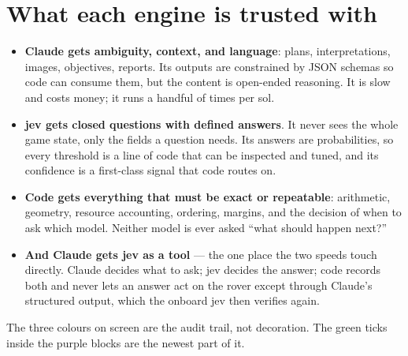 \documentclass[11pt]{article}
\begin{document}
\section{What each engine is trusted with}
\begin{itemize}
\item \textbf{Claude gets ambiguity, context, and language}: plans, interpretations, images, objectives, reports. Its outputs are constrained by JSON schemas so code can consume them, but the content is open-ended reasoning. It is slow and costs money; it runs a handful of times per sol.
\item \textbf{jev gets closed questions with defined answers}. It never sees the whole game state, only the fields a question needs. Its answers are probabilities, so every threshold is a line of code that can be inspected and tuned, and its confidence is a first-class signal that code routes on.
\item \textbf{Code gets everything that must be exact or repeatable}: arithmetic, geometry, resource accounting, ordering, margins, and the decision of when to ask which model. Neither model is ever asked ``what should happen next?''
\item \textbf{And Claude gets jev as a tool} --- the one place the two speeds touch directly. Claude decides what to ask; jev decides the answer; code records both and never lets an answer act on the rover except through Claude's structured output, which the onboard jev then verifies again.
\end{itemize}
The three colours on screen are the audit trail, not decoration. The green ticks inside the purple blocks are the newest part of it.
\end{document}
